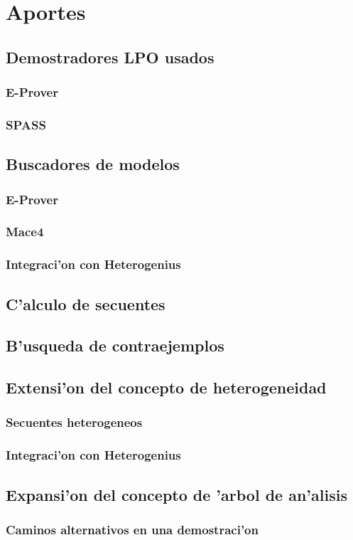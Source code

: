 \chapter{Aportes}

\section{Demostradores LPO usados}

\subsection{E-Prover}

\subsection{SPASS}

\section{Buscadores de modelos}

\subsection{E-Prover}

\subsection{Mace4}

\subsection{Integraci'on con Heterogenius}

\section{C'alculo de secuentes}

\section{B'usqueda de contraejemplos}


\section{Extensi'on del concepto de heterogeneidad}

\subsection{Secuentes heterogeneos}

\subsection{Integraci'on con Heterogenius}


\section{Expansi'on del concepto de 'arbol de an'alisis}

\subsection{Caminos alternativos en una demostraci'on}

